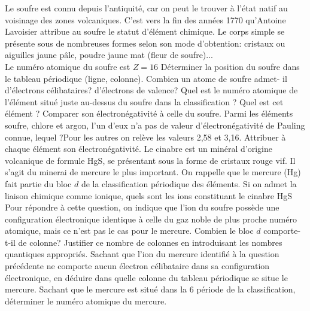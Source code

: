\begin{Exercise}[title=Le soufre et le cinabre]
	\ExePart[title=Le soufre]
	Le soufre est connu depuis l’antiquité, car on peut le trouver à l’état natif au voisinage des zones volcaniques. C’est vers la fin des années 1770 qu’Antoine Lavoisier attribue au soufre le statut d’élément chimique.
	Le corps simple se présente sous de nombreuses formes selon son mode d’obtention: cristaux ou
	aiguilles jaune pâle, poudre jaune mat (fleur de soufre)...\\
	Le numéro atomique du soufre est $Z=16$
	\Question Déterminer la position du soufre dans le tableau périodique (ligne, colonne).
	\Question Combien un atome de soufre admet-	il d’électrons célibataires? d’électrons de valence?
	\Question Quel est le numéro atomique de l’élément situé juste au-dessus du soufre dans la classification ? Quel est cet élément	? Comparer son électronégativité
	à celle du soufre.
	\Question Parmi les	éléments soufre, chlore et argon, l’un d’eux n’a pas de valeur d’électronégativité de 	Pauling connue,	lequel	?Pour les autres on relève les valeurs 2,58 et 3,16. Attribuer à chaque élément son électronégativité.
	\ExePart[title=le cinabre]
	Le cinabre est un minéral d’origine volcanique de formule HgS, se présentant sous la forme de cristaux rouge vif. Il s’agit du minerai de mercure le plus important.
	On rappelle que le mercure (Hg) fait partie du bloc $d$ de la classification périodique des éléments.
	\Question Si on admet la liaison chimique comme ionique, quels sont les ions constituant le cinabre HgS Pour répondre à cette question, on indique que l’ion du soufre possède une configuration électronique identique à celle du gaz noble de plus proche numéro atomique, mais ce n’est pas le cas pour le mercure.
	\Question Combien le bloc $d$ comporte-t-il de colonne? Justifier ce nombre de colonnes en introduisant les nombres quantiques appropriés.
	\Question Sachant que l’ion du mercure identifié à la question précédente ne comporte aucun électron célibataire dans sa configuration électronique, en déduire dans quelle colonne du tableau périodique se situe le mercure.
	\Question Sachant que le mercure est situé dans la 6 période de la classification, déterminer le numéro atomique du mercure.
\end{Exercise}
